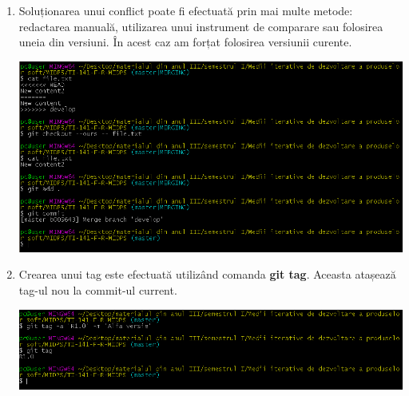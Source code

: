 \begin{enumerate}
\item Soluționarea unui conflict poate fi efectuată prin mai multe metode: redactarea manuală, utilizarea unui instrument de comparare sau folosirea uneia din versiuni. În acest caz am forțat folosirea versiunii curente.

\begin{minipage}{\linewidth}
	\centering
	\includegraphics[width=17cm]{solconf11}
\end{minipage}
\break

\item Crearea unui tag este efectuată utilizând comanda \textbf{git tag}. Aceasta atașează tag-ul nou la commit-ul current.

\begin{minipage}{\linewidth}
	\centering
	\includegraphics[width=17cm]{afistag12}
\end{minipage}
\break

\end{enumerate}


